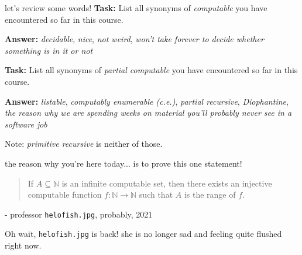 \documentclass{beamer}
\begin{document}
\begin{frame}{let's review some words!}
\textbf{Task:} List all synonyms of \textit{computable} you have encountered so far in this course.

\textbf{Answer:} \textit{decidable}, \textit{nice}, \textit{not weird}, \textit{won't take forever to decide whether something is in it or not}

\vspace{15mm}

\textbf{Task:} List all synonyms of \textit{partial computable} you have encountered so far in this course.

\textbf{Answer:} \textit{listable}, \textit{computably enumerable (c.e.)}, \textit{partial recursive}, \textit{Diophantine}, \textit{the reason why we are spending weeks on material you'll probably never see in a software job}


\vspace{20mm}

Note: \textit{primitive recursive} is neither of those. 
\end{frame}

\begin{frame}{the reason why you're here today...}
is to prove this one statement!

\vspace{20mm}

\begin{quotation}
If $A \subseteq \mathbb N$ is an infinite computable set, then there exists an injective computable function $f: \mathbb N \to \mathbb N$ such that $A$ is the range of $f$.
\end{quotation}
\begin{flushright}
- professor \texttt{helo\textunderscore fish.jpg}, probably, 2021\\
\end{flushright}

Oh wait, \texttt{helo\textunderscore fish.jpg} is back! she is no longer sad and feeling quite flushed right now.

\end{frame}
\end{document}
